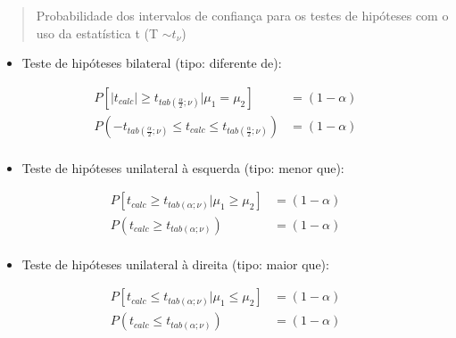 \documentclass[
]{book}
\providecommand{\tightlist}{%
  \setlength{\itemsep}{0pt}\setlength{\parskip}{0pt}}
\begin{document}
\hfill\break

\hfill\break

\begin{quote}
Probabilidade dos intervalos de confiança para os testes de hipóteses com o uso da estatística t (T \(\sim t_{\nu}\))
\end{quote}

\hfill\break

\begin{itemize}
\tightlist
\item
  Teste de hipóteses bilateral (tipo: diferente de):
\end{itemize}

\hfill\break

\begin{align*}
P[\left|t_{calc}\right| \ge  {t}_{tab\left(\frac{\alpha }{2};\nu \right)} |\mu_{1}  = \mu_{2}  ] & = (1-\alpha) \\
P( - {t}_{tab\left(\frac{\alpha }{2};\nu \right)}  \le t_{calc}  \le  {t}_{tab\left(\frac{\alpha }{2};\nu \right)} ) & = (1-\alpha)   \\
\end{align*}

\hfill\break

\begin{itemize}
\tightlist
\item
  Teste de hipóteses unilateral à esquerda (tipo: menor que):
\end{itemize}

\hfill\break

\begin{align*}
P[t_{calc} \ge {t}_{tab \left(\alpha ;\nu \right)} |\mu_{1} \ge  \mu_{2}] & = (1-\alpha)  \\
P(t_{calc}  \ge  {t}_{tab \left(\alpha ;\nu \right)}) & = (1-\alpha) \\
\end{align*}

\hfill\break

\begin{itemize}
\tightlist
\item
  Teste de hipóteses unilateral à direita (tipo: maior que):
\end{itemize}

\hfill\break

\begin{align*}
P[t_{calc} \le {t}_{tab \left(\alpha ;\nu \right)}|\mu_{1}  \le \mu_{2}] & = (1-\alpha) \\
P( t_{calc}  \le   {t}_{tab \left(\alpha ;\nu \right)} ) & = (1-\alpha) \\ 
\end{align*}
\end{document}
